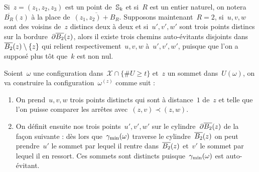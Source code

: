			\begin{rem}
				Si~$z = (z_1, z_2, z_3)$ est un point de~$\mathbb{S}_k$ et si~$R$ est un entier naturel, on notera~$\overline{B_R}(z)$ à la place de~$\overline{(z_1, z_2) + B_R}$. Supposons maintenant~$R=2$, si~$u, v, w$ sont des voisins de~$z$ distincs deux à deux et si~$u', v', w'$ sont trois points distincs sur la bordure~$\partial \overline{B_{2}}(z)$, alors il existe trois chemins auto-évitants disjoints dans~$\overline{B_{2}}(z)\setminus\{z\}$ qui relient respectivement~$u, v, w$ à~$u', v', w'$, puisque que l'on a supposé plus tôt que~$k$ est non nul. 
			\end{rem}
			\begin{dem}
				Soient~$\omega$ une configuration dans~$\mathcal{X}\cap\{\# U \geq t\}$ et~$z$ un sommet dans~$U(\omega)$, on va construire la configuration~$\omega^{(z)}$ comme suit :
				\begin{enumerate}
					\item On prend~$u,v,w$ trois points distincts qui sont  à distance~$1$ de~$z$  et telle que l'on puisse comparer les arrêtes avec~$(z,v)\prec (z,w)$.
					
					\item On définit ensuite nos trois points~$u',v',w'$ sur le cylindre~$\partial\overline{B_{2}}(z)$ de la façon suivante : dès lors que~$\gamma_{\mathrm{min}}(\omega)$ traverse le cylindre~$\overline{B_{2}}(z)$ on peut prendre~$u'$ le sommet par lequel il rentre dans~$\overline{B_{2}}(z)$ et~$v'$ le sommet par lequel il en ressort. Ces sommets sont distincts puisque~$\gamma_{\mathrm{min}}(\omega)$ est auto-évitant. 
					

\end{enumerate}
\end{dem}
